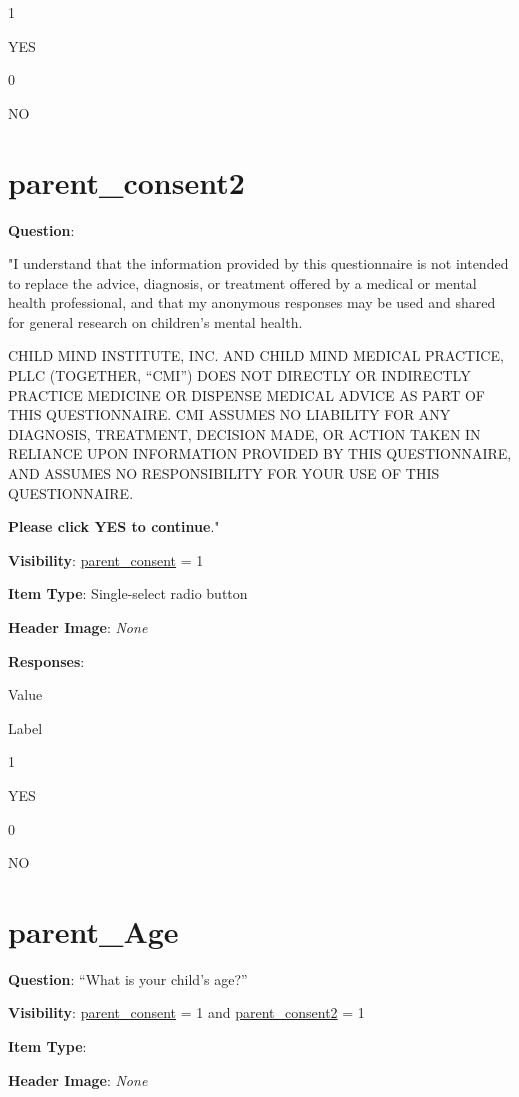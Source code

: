 \documentclass[]{book}
\begin{document}
1

YES

0

NO

\hypertarget{parent_consent2}{%
\section{parent\_consent2}\label{parent_consent2}}

\textbf{Question}:

"I understand that the information provided by this questionnaire is not intended to replace the advice, diagnosis, or treatment offered by a medical or mental health professional, and that my anonymous responses may be used and shared for general research on children's mental health.

CHILD MIND INSTITUTE, INC. AND CHILD MIND MEDICAL PRACTICE, PLLC (TOGETHER, ``CMI'') DOES NOT DIRECTLY OR INDIRECTLY PRACTICE MEDICINE OR DISPENSE MEDICAL ADVICE AS PART OF THIS QUESTIONNAIRE. CMI ASSUMES NO LIABILITY FOR ANY DIAGNOSIS, TREATMENT, DECISION MADE, OR ACTION TAKEN IN RELIANCE UPON INFORMATION PROVIDED BY THIS QUESTIONNAIRE, AND ASSUMES NO RESPONSIBILITY FOR YOUR USE OF THIS QUESTIONNAIRE.

\textbf{Please click YES to continue}."

\textbf{Visibility}: \protect\hyperlink{parent_consent}{parent\_consent} = 1

\textbf{Item Type}: Single-select radio button

\textbf{Header Image}: \emph{None}

\textbf{Responses}:

Value

Label

1

YES

0

NO

\hypertarget{parent_age}{%
\section{parent\_Age}\label{parent_age}}

\textbf{Question}: ``What is your child's age?''

\textbf{Visibility}: \protect\hyperlink{parent_consent}{parent\_consent} = 1 and \protect\hyperlink{parent_consent2}{parent\_consent2} = 1

\textbf{Item Type}:

\textbf{Header Image}: \emph{None}
\end{document}
